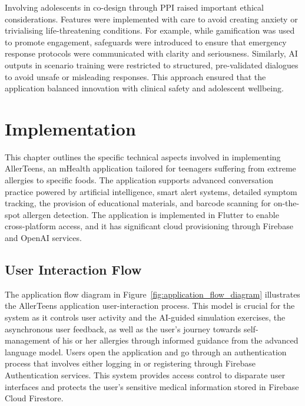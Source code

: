 \documentclass[MScCS]{uccthesis}
\begin{document}
Involving adolescents in co-design through PPI raised important ethical considerations. Features were implemented with care to avoid creating anxiety or trivialising life-threatening conditions. For example, while gamification was used to promote engagement, safeguards were introduced to ensure that emergency response protocols were communicated with clarity and seriousness. Similarly, AI outputs in scenario training were restricted to structured, pre-validated dialogues to avoid unsafe or misleading responses. This approach ensured that the application balanced innovation with clinical safety and adolescent wellbeing.



\clearpage

\chapter{Implementation}

This chapter outlines the specific technical aspects involved in implementing AllerTeens, an mHealth application tailored for teenagers suffering from extreme allergies to specific foods. The application supports advanced conversation practice powered by artificial intelligence, smart alert systems, detailed symptom tracking, the provision of educational materials, and barcode scanning for on-the-spot allergen detection. The application is implemented in Flutter to enable cross-platform access, and it has significant cloud provisioning through Firebase and OpenAI services. 

\section{User Interaction Flow}

The application flow diagram in Figure~\ref{fig:application_flow_diagram} illustrates the AllerTeens application user-interaction process. This model is crucial for the system as it controls user activity and the AI-guided simulation exercises, the asynchronous user feedback, as well as the user's journey towards self-management of his or her allergies through informed guidance from the advanced language model. Users open the application and go through an authentication process that involves either logging in or registering through Firebase Authentication services. This system provides access control to disparate user interfaces and protects the user's sensitive medical information stored in Firebase Cloud Firestore.
\end{document}
